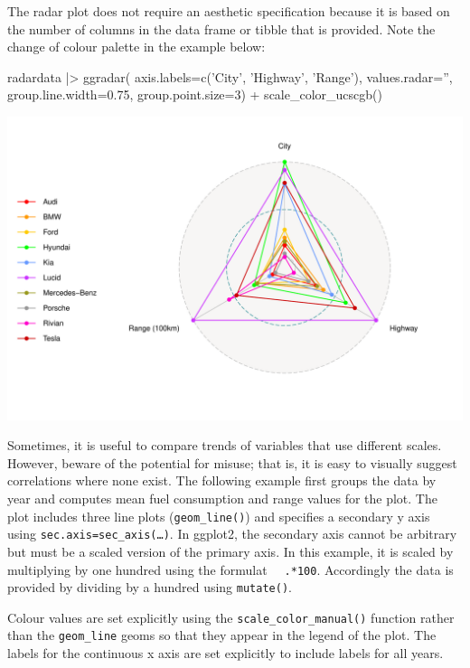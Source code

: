 The radar plot does not require an aesthetic specification because it is based on the number of columns in the data frame or tibble that is provided. Note the change of colour palette in the example below:

\begin{samepage}
\begin{Rcode}
radardata |>  
  ggradar(
    axis.labels=c('City', 'Highway', 'Range'), 
    values.radar='', 
    group.line.width=0.75, 
    group.point.size=3) +
  scale_color_ucscgb()
\end{Rcode}
\end{samepage}


\begin{center}
  \includegraphics[width=.75\textwidth]{fuel.radar.pdf}
\end{center}

Sometimes, it is useful to compare trends of variables that use different scales. However, beware of the potential for misuse; that is, it is easy to visually suggest correlations where none exist. The following example first groups the data by year and computes mean fuel consumption and range values for the plot. The plot includes three line plots (\texttt{geom\_line()}) and specifies a secondary y axis using \texttt{sec.axis=sec\_axis(\ldots)}. In ggplot2, the secondary axis cannot be arbitrary but must be a scaled version of the primary axis. In this example, it is scaled by multiplying by one hundred using the formulat \texttt{~ .*100}. Accordingly the data is provided by dividing by a hundred using \texttt{mutate()}. 

Colour values are set explicitly using the \texttt{scale\_color\_manual()} function rather than the \texttt{geom\_line} geoms so that they appear in the legend of the plot. The labels for the continuous x axis are set explicitly to include labels for all years. 

